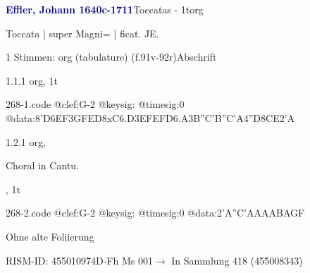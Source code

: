 \documentclass[twocolumn, 12pt]{book}
\begin{document}
\par \vspace{16pt} \textcolor{darkblue}{\textbf{Effler, Johann  1640c-1711}}\hfillplus{\textbf{[268]}}\newline Toccatas - 1t\newline org
\par \begin{itshape}[f.91v, at left:] Toccata | super Magni= | ficat. JE.\end{itshape} 
\par \textcolor{darkblue}{}  1 Stimmen: org (tabulature)  (f.91v-92r)\newline Abschrift
\par 1.1.1  org, 1t  
\begin{filecontents*}{268-1.code}
@clef:G-2
@keysig:
@timesig:0
@data:{8'D6EF}{3GFED}8xC{6.D3E}{FEFD}{6.A3B}{''C'B''C'A}4''D{8CE}2'A
\end{filecontents*}
\newline %
\par 1.2.1  org, \begin{itshape}Choral in Cantu.\end{itshape}, 1t  
\begin{filecontents*}{268-2.code}
@clef:G-2
@keysig:
@timesig:0
@data:2'A''C'AAAABAGF
\end{filecontents*}
\newline %
\par Ohne alte Foliierung
\par RISM-ID: 455010974\newline D-Fh  Ms 001\newline $\rightarrow$ In Sammlung 418 (455008343)
      
\end{document}
